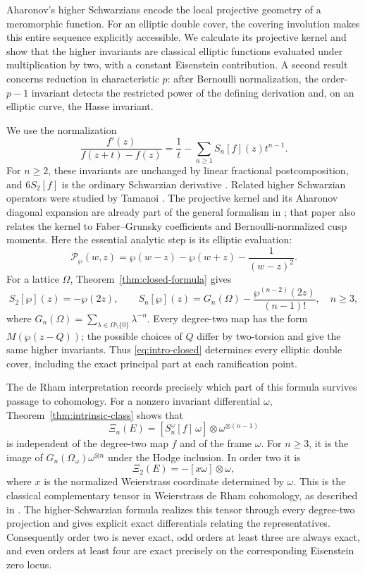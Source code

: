 \documentclass[11pt]{amsart}
\theoremstyle{definition}
\theoremstyle{remark}
\numberwithin{equation}{section}
\begin{document}
Aharonov's higher Schwarzians encode the local projective geometry of a
meromorphic function. For an elliptic double cover, the covering
involution makes this entire sequence explicitly accessible. We
calculate its projective kernel and show that the higher invariants
are classical elliptic functions evaluated under multiplication by
two, with a constant Eisenstein contribution. A second result concerns
reduction in characteristic $p$: after Bernoulli normalization, the
order-$p-1$ invariant detects the restricted power of the defining
derivation and, on an elliptic curve, the Hasse invariant.

We use the normalization
\[
\frac{f'(z)}{f(z+t)-f(z)}
=\frac1t-\sum_{n\geq1}S_n[f](z)t^{n-1}.
\]
For $n\geq2$, these invariants are unchanged by linear fractional
postcomposition, and $6S_2[f]$ is the ordinary Schwarzian derivative
\cite{aharonov}. Related higher Schwarzian operators were studied by
Tamanoi \cite{tamanoi}. The projective kernel and its Aharonov diagonal
expansion are already part of the general formalism in
\cite[Eq.~(2.3) and Proposition~4.1]{saber-sebbar}; that paper also
relates the kernel to Faber--Grunsky coefficients and Bernoulli-normalized
cusp moments. Here the essential analytic step is its elliptic
evaluation:
\[
\mathcal P_{\wp}(w,z)
=\wp(w-z)-\wp(w+z)-\frac1{(w-z)^2}.
\]
For a lattice $\Omega$, Theorem~\ref{thm:closed-formula} gives
\begin{equation}\label{eq:intro-closed}
S_2[\wp](z)=-\wp(2z),\qquad
S_n[\wp](z)=G_n(\Omega)-\frac{\wp^{(n-2)}(2z)}{(n-1)!},
\quad n\geq3,
\end{equation}
where $G_n(\Omega)=\sum_{\lambda\in\Omega\setminus\{0\}}\lambda^{-n}$.
Every degree-two map has the form $M(\wp(z-Q))$; the possible choices of
$Q$ differ by two-torsion and give the same higher invariants. Thus
\eqref{eq:intro-closed} determines every elliptic double cover, including
the exact principal part at each ramification point.

The de Rham interpretation records precisely which part of this
formula survives passage to cohomology. For a nonzero invariant
differential $\omega$, Theorem~\ref{thm:intrinsic-class} shows that
\[
\Xi_n(E)=[S_n^\omega[f]\,\omega]\otimes\omega^{\otimes(n-1)}
\]
is independent of the degree-two map $f$ and of the frame $\omega$.
For $n\geq3$, it is the image of
$G_n(\Omega_\omega)\omega^{\otimes n}$ under the Hodge inclusion.
In order two it is
\[
\Xi_2(E)=-[x\omega]\otimes\omega,
\]
where $x$ is the normalized Weierstrass coordinate determined by
$\omega$. This is the classical complementary tensor in Weierstrass
de Rham cohomology, as described in
\cite[Appendix~A1.2, Eqs.~(A1.2.4)--(A1.2.6)]{katz}.
The higher-Schwarzian formula realizes this tensor through every
degree-two projection and gives explicit exact differentials relating
the representatives. Consequently order two is never exact, odd
orders at least three are always exact, and even orders at least four
are exact precisely on the corresponding Eisenstein zero locus.
\end{document}
